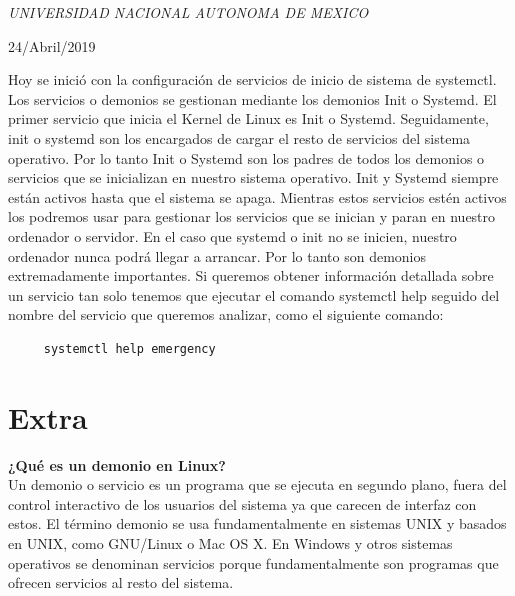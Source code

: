 \documentclass[a4paper, 11pt, oneside]{article}
\begin{document}
\begin{titlepage}
	\textit{UNIVERSIDAD NACIONAL AUTONOMA DE MEXICO} 
	
	\vfill
	
	
	
	
	\vspace{0.3\baselineskip} 
	
	24/Abril/2019 
	
	 

\end{titlepage}
 Hoy se inició con la configuración de servicios de inicio de sistema de systemctl. Los servicios o demonios se gestionan mediante los demonios Init o Systemd. El primer servicio que inicia el Kernel de Linux es Init o Systemd. Seguidamente, init o systemd son los encargados de cargar el resto de servicios del sistema operativo. Por lo tanto Init o Systemd son los padres de todos los demonios o servicios que se inicializan en nuestro sistema operativo. Init y Systemd siempre están activos hasta que el sistema se apaga. Mientras estos servicios estén activos los podremos usar para gestionar los servicios que se inician y paran en nuestro ordenador o servidor. En el caso que systemd o init no se inicien, nuestro ordenador nunca podrá llegar a arrancar. Por lo tanto son demonios extremadamente importantes. Si queremos obtener información detallada sobre un servicio tan solo tenemos que ejecutar el comando systemctl help seguido del nombre del servicio que queremos analizar, como el siguiente comando:
 \begin{verbatim}
     systemctl help emergency
 \end{verbatim}
\section*{Extra}
\textbf{¿Qué es un demonio en Linux?}\\
Un demonio o servicio es un programa que se ejecuta en segundo plano, fuera del control interactivo de los usuarios del sistema ya que carecen de interfaz con estos. El término demonio se usa fundamentalmente en sistemas UNIX y basados en UNIX, como GNU/Linux o Mac OS X. En Windows y otros sistemas operativos se denominan servicios porque fundamentalmente son programas que ofrecen servicios al resto del sistema.
\end{document}
